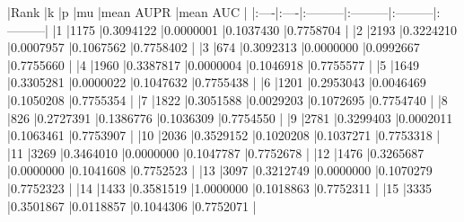 \documentclass{article}
\begin{document}
\begin{Schunk}
\begin{Soutput}
|Rank |k    |p         |mu        |mean AUPR |mean AUC  |
|:----|:----|:---------|:---------|:---------|:---------|
|1    |1175 |0.3094122 |0.0000001 |0.1037430 |0.7758704 |
|2    |2193 |0.3224210 |0.0007957 |0.1067562 |0.7758402 |
|3    |674  |0.3092313 |0.0000000 |0.0992667 |0.7755660 |
|4    |1960 |0.3387817 |0.0000004 |0.1046918 |0.7755577 |
|5    |1649 |0.3305281 |0.0000022 |0.1047632 |0.7755438 |
|6    |1201 |0.2953043 |0.0046469 |0.1050208 |0.7755354 |
|7    |1822 |0.3051588 |0.0029203 |0.1072695 |0.7754740 |
|8    |826  |0.2727391 |0.1386776 |0.1036309 |0.7754550 |
|9    |2781 |0.3299403 |0.0002011 |0.1063461 |0.7753907 |
|10   |2036 |0.3529152 |0.1020208 |0.1037271 |0.7753318 |
|11   |3269 |0.3464010 |0.0000000 |0.1047787 |0.7752678 |
|12   |1476 |0.3265687 |0.0000000 |0.1041608 |0.7752523 |
|13   |3097 |0.3212749 |0.0000000 |0.1070279 |0.7752323 |
|14   |1433 |0.3581519 |1.0000000 |0.1018863 |0.7752311 |
|15   |3335 |0.3501867 |0.0118857 |0.1044306 |0.7752071 |
\end{Soutput}
\end{Schunk}
\end{document}
